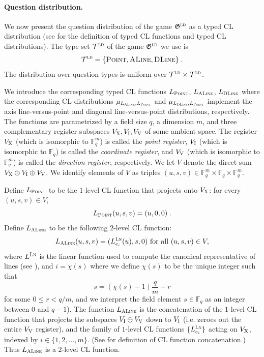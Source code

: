 \documentclass[11pt]{article}
\theoremstyle{definition}
\newcommand{\F}{\ensuremath{\mathbb{F}}}
\newcommand{\ld}{\textsc{ld}}
\newcommand{\game}{\mathfrak{G}}
\newcommand{\type}{\mathcal{T}}
\newcommand{\labelstyle}[1]{\ensuremath{\textsc{#1}}\xspace}
\newcommand{\xpt}{\labelstyle{X}}
\newcommand{\dir}[1]{\labelstyle{V#1}}
\newcommand{\coord}{\labelstyle{I}}
\newcommand{\lnf}{\labelstyle{Ln}}
\newcommand{\typestyle}[1]{\ensuremath{\textsc{#1}}\xspace}
\newcommand{\Point}{\typestyle{Point}}
\newcommand{\ALine}{\typestyle{ALine}}
\newcommand{\DLine}{\typestyle{DLine}}
\begin{document}
\paragraph{Question distribution.}
We now present the question distribution of the game $\game^\ld$ as a typed CL
distribution (see  for the definition of typed CL functions and
typed CL distributions).
The type set $\type^\ld$ of the game $\game^\ld$ we use is
\[
	\type^\ld = \{ \Point, \ALine, \DLine \}\;.
\]
The distribution over question types is uniform over $\type^\ld \times \type^\ld$. 

We introduce the corresponding typed CL functions $L_\Point$, $L_\ALine$,
$L_\DLine$ where the corresponding CL distributions $\mu_{L_\ALine,L_\Point}$
and $\mu_{L_\DLine,L_\Point}$ implement the axis line-versus-point and diagonal
line-versus-point distributions, respectively.
The functions are parametrized by a field size $q$, a dimension $m$, and three
complementary register subspaces $V_\xpt,V_{\coord}, V_{\dir{}}$ of some ambient
space.
The register $V_\xpt$ (which is isomorphic to $\F_q^m$) is called the
\emph{point register}, $V_\coord$ (which is isomorphic to $\F_q$) is called the
\emph{coordinate register}, and $V_{\dir{}}$ (which is isomorphic to $\F_q^m$)
is called the \emph{direction register}, respectively.
We let $V$ denote the direct sum $V_\xpt \oplus V_{\coord} \oplus V_{\dir{}}$.
We identify elements of $V$ as triples $(u,s,v) \in \F_q^m \times \F_q \times
\F_q^m$.

Define $L_\Point$ to be the $1$-level CL function that projects onto $V_\xpt$: for every $(u,s,v) \in V$,
\begin{equation}
  \label{eq:cl-ptf}
	L_\Point(u,s,v) = (u,0,0) \;.
\end{equation}
Define $L_\ALine$ to be the following $2$-level CL function:
\begin{equation}
  \label{eq:cl-alnf}
	L_\ALine(u,s,v) = (L^\lnf_{e_i}(u), s, 0)\ \text{for all } (u,s,v) \in V,
\end{equation}
where $L^\lnf$ is the linear function used to compute the canonical
representative of lines (see ), and $i = \chi(s)$
where we define $\chi(s)$ to be the unique integer such that
\begin{equation}
\label{eq:chi-func}
	s = (\chi(s) - 1) \frac{q}{m} + r
\end{equation}
for some $0 \leq r < q/m$, and we interpret the field element $s \in \F_q$ as an
integer between $0$ and $q - 1$).
The function $L_\ALine$ is the concatenation of the $1$-level CL function that
projects the subspaces $V_{\coord} \oplus V_{\dir{}}$ down to $V_\coord$ (i.e.
zeroes out the entire $V_{\dir{}}$ register), and the family of $1$-level CL
functions $\{L^\lnf_{e_i} \}$ acting on $V_\xpt$, indexed by $i \in
\{1,2,\ldots,m\}$.
(See  for definition of CL function concatenation.)
Thus $L_\ALine$ is a $2$-level CL function.
\end{document}
